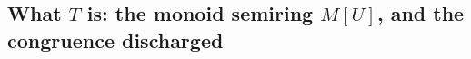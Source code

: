 \subsection{What $T$ is: the monoid semiring $M[U]$, and the congruence discharged}\label{sec:placement2}

